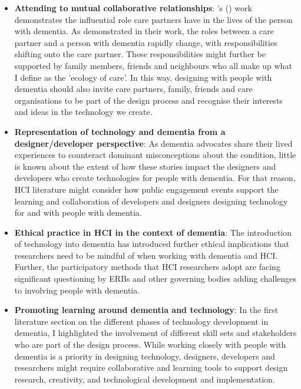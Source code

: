 \begin{itemize}

     \item \textbf{Attending to mutual collaborative relationships}: \citeauthor{ryan_dementia_2009}'s (\citeyear{ryan_dementia_2009}) work demonstrates the influential role care partners have in the lives of the person with dementia. As demonstrated in their work, the roles between a care partner and a person with dementia rapidly change, with responsibilities shifting onto the care partner. These responsibilities might further be supported by family members, friends and neighbours who all make up what I define as the 'ecology of care'. In this way, designing with people with dementia should also invite care partners, family, friends and care organisations to be part of the design process and recognise their interests and ideas in the technology we create.

    \item \textbf{Representation of technology and dementia from a designer/developer perspective}: As dementia advocates share their lived experiences to counteract dominant misconceptions about the condition, little is known about the extent of how these stories impact the designers and developers who create technologies for people with dementia. For that reason, HCI literature might consider how public engagement events support the learning and collaboration of developers and designers designing technology for and with people with dementia.

    \item \textbf{Ethical practice in HCI in the context of dementia}: The introduction of technology into dementia has introduced further ethical implications that researchers need to be mindful of when working with dementia and HCI. Further, the participatory methods that HCI researchers adopt are facing significant questioning by ERBs and other governing bodies adding challenges to involving people with dementia.

    \item \textbf{Promoting learning around dementia and technology}: In the first literature section on the different phases of technology development in dementia, I highlighted the involvement of different skill sets and stakeholders who are part of the design process. While working closely with people with dementia is a priority in designing technology, designers, developers and researchers might require collaborative and learning tools to support design research, creativity, and technological development and implementation.  
\end{itemize}

